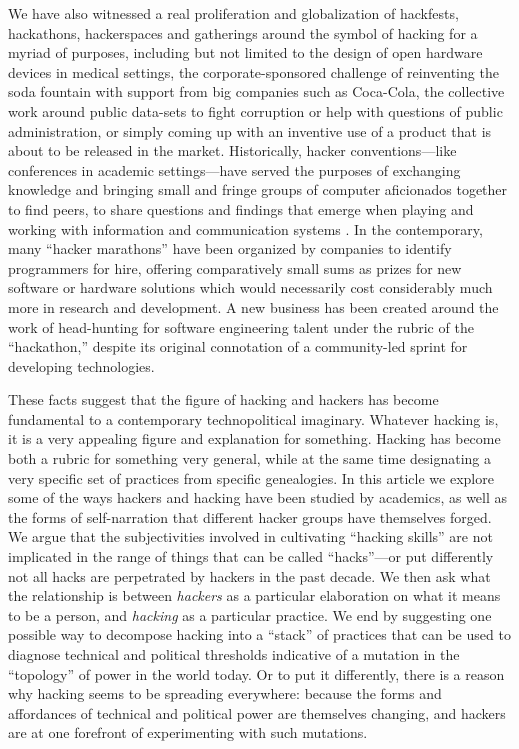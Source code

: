 \documentclass[10pt,letter,oneside]{scrartcl}
\begin{document}
We have also witnessed a real proliferation and globalization of hackfests,
hackathons, hackerspaces and gatherings around the symbol of hacking for a myriad of
purposes, including but not limited to the design of open hardware devices in
medical settings, the corporate-sponsored challenge of reinventing the soda
fountain with support from big companies such as Coca-Cola, the collective work
around public data-sets to fight corruption or help with questions of public
administration, or simply coming up with an inventive use of a product that is
about to be released in the market.  Historically, hacker conventions---like
conferences in academic settings---have served the purposes of exchanging
knowledge and bringing small and fringe groups of computer aficionados together
to find peers, to share questions and findings that emerge when playing and
working with information and communication
systems \parencite{coleman_conference_2010}.  In the contemporary, many ``hacker
marathons'' have been organized by companies to identify programmers for hire,
offering comparatively small sums as prizes for new software or hardware
solutions which would necessarily cost considerably much more in research and
development.  A new business has been created around the work of head-hunting
for software engineering talent under the rubric of the ``hackathon,'' despite
its original connotation of a community-led sprint for developing technologies.

These facts suggest that the figure of hacking and hackers has become
fundamental to a contemporary technopolitical imaginary.  Whatever hacking is,
it is a very appealing figure and explanation for something.  Hacking has
become both a rubric for something very general, while at the same time designating 
a very specific set of practices from specific genealogies.  In this article we 
explore some of the ways hackers and hacking have been studied by academics, as 
well as the forms of self-narration that different hacker groups have themselves 
forged.  We argue that the subjectivities involved in cultivating ``hacking skills'' 
are not implicated in the range of things that can be called ``hacks''---or put differently not all hacks are perpetrated by hackers in the past decade.  We 
then ask what the relationship is between \emph{hackers} as a particular elaboration 
on what it means to be a person, and \emph{hacking} as a particular practice.  
We end by suggesting one possible way to decompose hacking into a ``stack'' of 
practices that can be used to diagnose technical and political thresholds 
indicative of a mutation in the ``topology'' of power in the world today.  
Or to put it differently, there is a reason why hacking seems to be spreading 
everywhere: because the forms and affordances of technical and political power 
are themselves changing, and hackers are at one forefront of experimenting with 
such mutations.
\end{document}
